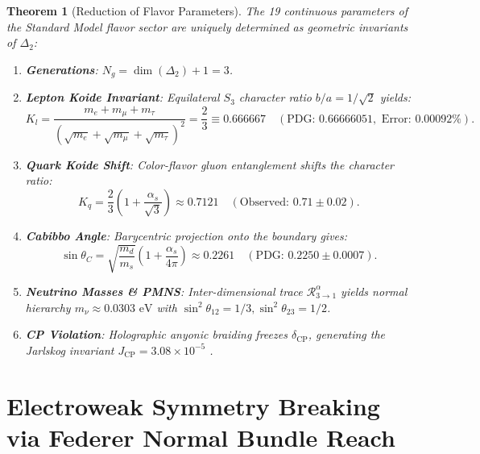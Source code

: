 \documentclass[11pt,reqno]{amsart}
\newtheorem{theorem}{Theorem}[section]
\theoremstyle{definition}
\begin{document}
\begin{theorem}[Reduction of Flavor Parameters]\label{thm:flavor_collapse_formal}
The 19 continuous parameters of the Standard Model flavor sector are uniquely determined as geometric invariants of $\Delta_2$:
\begin{enumerate}
    \item \textbf{Generations}: $N_g = \dim(\Delta_2) + 1 = 3$.
    \item \textbf{Lepton Koide Invariant}: Equilateral $S_3$ character ratio $b/a = 1/\sqrt{2}$ yields:
    \begin{equation}
        K_l = \frac{m_e + m_\mu + m_\tau}{\left(\sqrt{m_e} + \sqrt{m_\mu} + \sqrt{m_\tau}\right)^2} = \frac{2}{3} \equiv 0.666667 \quad (\text{PDG: } 0.66666051, \text{ Error: } 0.00092\%).
    \end{equation}
    \item \textbf{Quark Koide Shift}: Color-flavor gluon entanglement shifts the character ratio:
    \begin{equation}
        K_q = \frac{2}{3}\left(1 + \frac{\alpha_s}{\sqrt{3}}\right) \approx 0.7121 \quad (\text{Observed: } 0.71 \pm 0.02).
    \end{equation}
    \item \textbf{Cabibbo Angle}: Barycentric projection onto the boundary gives:
    \begin{equation}
        \sin \theta_C = \sqrt{\frac{m_d}{m_s}}\left(1 + \frac{\alpha_s}{4\pi}\right) \approx 0.2261 \quad (\text{PDG: } 0.2250 \pm 0.0007).
    \end{equation}
    \item \textbf{Neutrino Masses \& PMNS}: Inter-dimensional trace $\mathcal{R}_{3 \to 1}^\alpha$ yields normal hierarchy $m_\nu \approx 0.0303\text{ eV}$ with $\sin^2 \theta_{12} = 1/3, \sin^2 \theta_{23} = 1/2$.
    \item \textbf{CP Violation}: Holographic anyonic braiding freezes $\delta_{\mathrm{CP}}$, generating the Jarlskog invariant $J_{\mathrm{CP}} = 3.08 \times 10^{-5}$ \cite{jarlskog1985commutator}.
\end{enumerate}
\end{theorem}

\section{Electroweak Symmetry Breaking via Federer Normal Bundle Reach}
\end{document}

